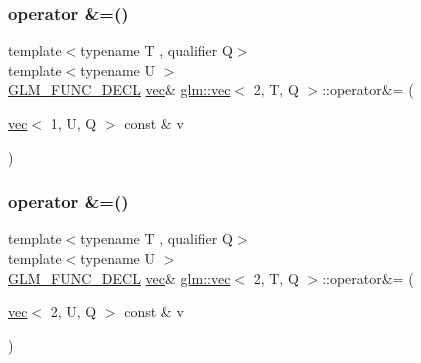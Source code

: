 \mbox{\label{structglm_1_1vec_3_012_00_01_t_00_01_q_01_4_a0f1cfa1940438903f605b620a928ce38}} 
\subsubsection{\texorpdfstring{operator \&=()}{operator \&=()}\hspace{0.1cm}{\footnotesize\ttfamily [2/3]}}
{\footnotesize\ttfamily template$<$typename T , qualifier Q$>$ \\
template$<$typename U $>$ \\
\mbox{\hyperlink{setup_8hpp_ab2d052de21a70539923e9bcbf6e83a51}{G\+L\+M\+\_\+\+F\+U\+N\+C\+\_\+\+D\+E\+CL}} \mbox{\hyperlink{structglm_1_1vec}{vec}}\& \mbox{\hyperlink{structglm_1_1vec}{glm\+::vec}}$<$ 2, T, Q $>$\+::operator\&= (\begin{DoxyParamCaption}\item[{\mbox{\hyperlink{structglm_1_1vec}{vec}}$<$ 1, U, Q $>$ const \&}]{v }\end{DoxyParamCaption})}

\mbox{\label{structglm_1_1vec_3_012_00_01_t_00_01_q_01_4_a09a49ab5d55622ad568b054276c84786}} 
\subsubsection{\texorpdfstring{operator \&=()}{operator \&=()}\hspace{0.1cm}{\footnotesize\ttfamily [3/3]}}
{\footnotesize\ttfamily template$<$typename T , qualifier Q$>$ \\
template$<$typename U $>$ \\
\mbox{\hyperlink{setup_8hpp_ab2d052de21a70539923e9bcbf6e83a51}{G\+L\+M\+\_\+\+F\+U\+N\+C\+\_\+\+D\+E\+CL}} \mbox{\hyperlink{structglm_1_1vec}{vec}}\& \mbox{\hyperlink{structglm_1_1vec}{glm\+::vec}}$<$ 2, T, Q $>$\+::operator\&= (\begin{DoxyParamCaption}\item[{\mbox{\hyperlink{structglm_1_1vec}{vec}}$<$ 2, U, Q $>$ const \&}]{v }\end{DoxyParamCaption})}

